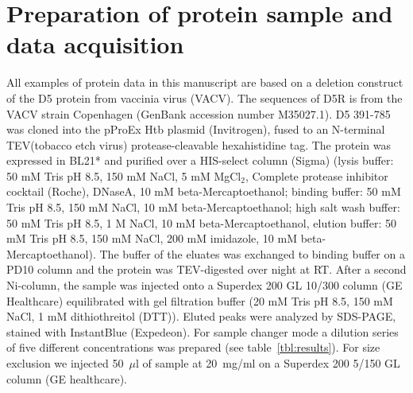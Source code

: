 \documentclass[preprint,pdf]{iucr}              %
\begin{document}
\appendix
{}






\section{Preparation of protein sample and data acquisition}
All examples of protein data in this manuscript are based on a deletion construct of
the D5 protein from vaccinia virus (VACV).
The sequences of D5R is from the VACV strain Copenhagen (GenBank accession number M35027.1).
D5 391-785 was cloned into the pProEx Htb plasmid (Invitrogen), fused to an N-terminal
TEV(tobacco etch virus) protease-cleavable hexahistidine tag. The protein was expressed in
BL21* and purified over a HIS-select column (Sigma) (lysis buffer: 50 mM Tris pH 8.5, 150 mM NaCl,
5 mM MgCl$_{2}$, Complete protease inhibitor cocktail (Roche), DNaseA, 10 mM beta-Mercaptoethanol; 
binding buffer: 50 mM Tris pH 8.5, 150 mM NaCl, 10 mM beta-Mercaptoethanol; 
high salt wash buffer: 50 mM Tris pH 8.5, 1 M NaCl, 10 mM beta-Mercaptoethanol, 
elution buffer: 50 mM Tris pH 8.5, 150 mM NaCl,  200 mM imidazole, 10 mM beta-Mercaptoethanol). 
The buffer of the eluates was exchanged to binding buffer on a PD10 column and the protein was 
TEV-digested over night at RT. After a second Ni-column, the sample was injected onto a 
Superdex 200 GL 10/300 column (GE Healthcare) equilibrated with gel filtration buffer 
(20 mM Tris pH 8.5, 150 mM NaCl, 1 mM dithiothreitol (DTT)). Eluted peaks were analyzed by 
SDS-PAGE, stained with InstantBlue (Expedeon).
For sample changer mode a dilution series of five different concentrations was prepared
(see table~\ref{tbl:results}). For size exclusion we injected 50~$\mu$l of sample at 20~mg/ml on a Superdex
200 5/150 GL column (GE healthcare).
\end{document}
